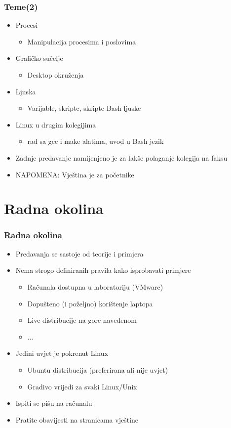 \documentclass{beamer}
\begin{document}
\begin{frame}[t]
\frametitle{Teme(2)}
\begin{itemize}
	\item Procesi
	\begin{itemize}
		\item Manipulacija procesima i poslovima
	\end{itemize}
	\item Grafičko sučelje
	\begin{itemize}
		\item Desktop okruženja
	\end{itemize}
	\item Ljuska
	\begin{itemize}
		\item Varijable, skripte, skripte Bash ljuske 
	\end{itemize}
	\item Linux u drugim kolegijima
	\begin{itemize}
		\item rad sa gcc i make alatima, uvod u Bash jezik
	\end{itemize}
	\item Zadnje predavanje namijenjeno je za lakše polaganje kolegija na faksu
	\item NAPOMENA: Vještina je za početnike
\end{itemize}
\end{frame}

\section{Radna okolina}
\begin{frame}[t]
\frametitle{Radna okolina}
\begin{itemize}
	\item Predavanja se sastoje od teorije i primjera
	\item Nema strogo definiranih pravila kako isprobavati primjere
	\begin{itemize}
		\item Računala dostupna u laboratoriju (VMware)
		\item Dopušteno (i poželjno) korištenje laptopa
		\item Live distribucije na gore navedenom
		\item ...
	\end{itemize} 
	\item Jedini uvjet je pokrenut Linux
	\begin{itemize}
		\item Ubuntu distribucija (preferirana ali nije uvjet)
		\item Gradivo vrijedi za svaki Linux/Unix
	\end{itemize}
	\item Ispiti se pišu na računalu
	\item Pratite obavijesti na stranicama vještine
\end{itemize}
\end{frame}
\end{document}
